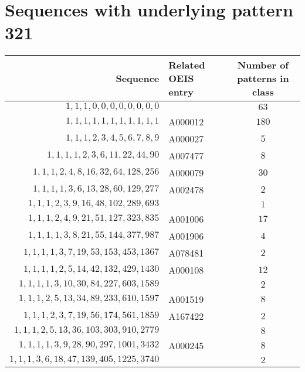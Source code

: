 \section{Sequences with underlying pattern 321}
\begin{longtabu}{|r|l|c|}
    \hline
    Sequence & Related OEIS entry & Number of patterns in class\\
    \hline
    \endfirsthead
    \hline
    \endhead
    \hline
    \endfoot
    \(    1,    1,    1,    0,    0,    0,    0,    0,    0,    0,    0\) & 	& \(63\)\\
    \(    1,    1,    1,    1,    1,    1,    1,    1,    1,    1,    1\) & A000012 & \(180\)\\
    \(    1,    1,    1,    2,    3,    4,    5,    6,    7,    8,    9\) &	A000027 & \(5\)\\
    \(    1,    1,    1,    1,    2,    3,    6,   11,   22,   44,   90\) &	A007477 & \(8\)\\
    \(    1,    1,    1,    2,    4,    8,   16,   32,   64,  128,  256\) &	A000079 & \(30\)\\
    \(    1,    1,    1,    1,    3,    6,   13,   28,   60,  129,  277\) &	A002478 & \(2\)\\
    \(    1,    1,    1,    2,    3,    9,   16,   48,  102,  289,  693\) &  & \(1\)\\
    \(    1,    1,    1,    2,    4,    9,   21,   51,  127,  323,  835\) &	A001006 & \(17\)\\
    \(    1,    1,    1,    1,    3,    8,   21,   55,  144,  377,  987\) &	A001906 & \(4\)\\
    \(    1,    1,    1,    1,    3,    7,   19,   53,  153,  453, 1367\) &	A078481 & \(2\)\\
    \(    1,    1,    1,    1,    2,    5,   14,   42,  132,  429, 1430\) &	A000108 & \(12\)\\
    \(    1,    1,    1,    1,    3,   10,   30,   84,  227,  603, 1589\) & 	& \(2\)\\
    \(    1,    1,    1,    2,    5,   13,   34,   89,  233,  610, 1597\) &	A001519 & \(8\)\\
    \(    1,    1,    1,    2,    3,    7,   19,   56,  174,  561, 1859\) &	A167422 & \(2\)\\
    \(    1,    1,    1,    2,    5,   13,   36,  103,  303,  910, 2779\) &	 & \(8\)\\
    \(    1,    1,    1,    1,    3,    9,   28,   90,  297, 1001, 3432\) &	A000245 & \(8\)\\
    \(    1,    1,    1,    3,    6,   18,   47,  139,  405, 1225, 3740\) &  & \(2\)\\

\end{longtabu}
